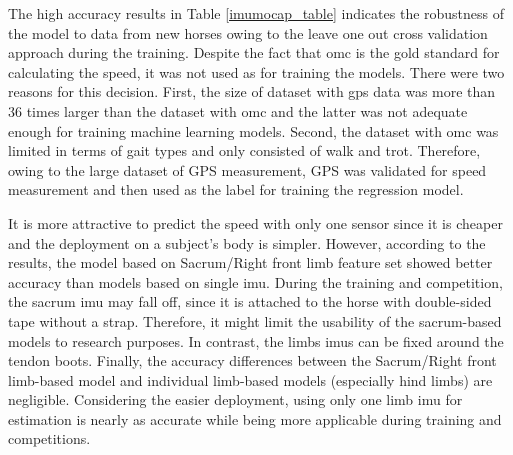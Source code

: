 The high accuracy results in Table \ref{imumocap_table} indicates the robustness of the model to data from new horses owing to the leave one out cross validation approach during the training. Despite the fact that \gls{omc} is the gold standard for calculating the speed, it was not used as for training the models. There were two reasons for this decision. First, the size of dataset with \gls{gps} data was more than 36 times larger than the dataset with \gls{omc} and the latter was not adequate enough for training machine learning models. Second, the dataset with \gls{omc} was limited in terms of gait types and only consisted of walk and trot. Therefore, owing to the large dataset of GPS measurement, GPS was validated for speed measurement and then used as the label for training the regression model.

It is more attractive to predict the speed with only one sensor since it is cheaper and the deployment on a subject's body is simpler. However, according to the results, the model based on Sacrum/Right front limb feature set showed better accuracy than models based on single \gls{imu}. During the training and competition, the sacrum \gls{imu} may fall off, since it is attached to the horse with double-sided tape without a strap. Therefore, it might limit the usability of the sacrum-based models to research purposes. In contrast, the limbs \gls{imu}s can be fixed around the tendon boots. Finally, the accuracy differences between the Sacrum/Right front limb-based model and individual limb-based models (especially hind limbs) are negligible. Considering the easier deployment, using only one limb \gls{imu} for estimation is nearly as accurate while being more applicable during training and competitions.



